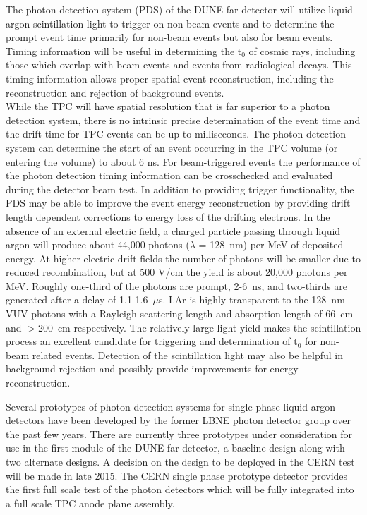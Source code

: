 



The photon detection system (PDS) of the DUNE far detector will utilize liquid argon scintillation light to trigger on non-beam events and to
determine the prompt event time primarily for non-beam events but also for beam events. 
Timing information will be useful in determining the t$_0$ of cosmic rays, including those which 
overlap with beam events and events from radiological decays. This timing information allows proper spatial event reconstruction, including 
the reconstruction and rejection of background events.\\
%
While the TPC will have spatial resolution that is far superior to a photon detection system, there is no intrinsic precise determination of the event time and the drift time for TPC events can be up to milliseconds. The photon detection system can determine the start of an event occurring in the TPC volume (or entering the volume) to about 6 ns. For beam-triggered events the performance of the photon detection timing information can be crosschecked and evaluated during the detector beam test. In addition to providing trigger functionality, the PDS may be able to improve the event energy reconstruction by providing drift length dependent corrections to energy loss of the drifting electrons.
In the absence of an external electric field, a charged particle passing through liquid argon will produce about 44,000 photons ($\lambda$ = 128~nm) per MeV of deposited energy. 
At higher electric drift fields the number of photons will be smaller due to reduced recombination, but at 500 V/cm the yield is about 20,000 photons per MeV. Roughly one-third of the photons are prompt, 2-6~ns, and two-thirds are generated after a delay of 1.1-1.6~$\mu$s. LAr is highly transparent to the 128~nm VUV photons with a Rayleigh scattering length and absorption length of 66~cm \cite{rayleigh} and $>$200~cm \cite{absorption} respectively. The relatively large light yield makes the scintillation process an excellent candidate for triggering and  determination of t$_0$ for non-beam related events. Detection of the scintillation light may also be helpful in background rejection and possibly
provide improvements for energy reconstruction.

Several prototypes of photon detection systems for single phase liquid argon detectors have been developed by the former LBNE photon detector group over the past few years. There are currently three prototypes under consideration for use in the first module of the DUNE far detector, a baseline design along with two alternate designs. A decision on the design to be deployed in the CERN test will be made in late 2015. The CERN single phase prototype detector provides the first full scale test of the photon detectors which will be fully integrated into a 
full scale TPC anode plane assembly. 

